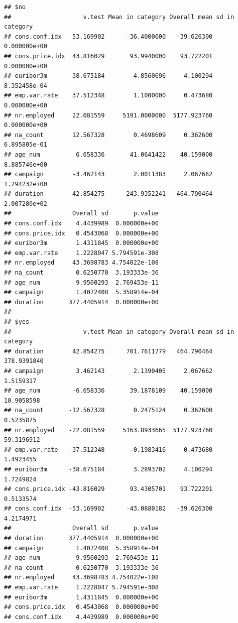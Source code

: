 \documentclass[
]{article}
\newenvironment{Shaded}{\begin{snugshade}}{\end{snugshade}}
\newcommand{\CommentTok}[1]{\textcolor[rgb]{0.56,0.35,0.01}{\textit{#1}}}
\newcommand{\NormalTok}[1]{#1}
\newcommand{\SpecialCharTok}[1]{\textcolor[rgb]{0.00,0.00,0.00}{#1}}
\begin{document}
\begin{verbatim}
## $no
##                    v.test Mean in category Overall mean sd in category
## cons.conf.idx   53.169902      -36.4000000   -39.626300   0.000000e+00
## cons.price.idx  43.816029       93.9940000    93.722201   0.000000e+00
## euribor3m       38.675184        4.8560696     4.100294   8.352458e-04
## emp.var.rate    37.512348        1.1000000     0.473680   0.000000e+00
## nr.employed     22.081559     5191.0000000  5177.923760   0.000000e+00
## na_count        12.567328        0.4698609     0.362600   6.895805e-01
## age_num          6.658336       41.0641422    40.159000   8.885746e+00
## campaign        -3.462143        2.0011383     2.067662   1.294232e+00
## duration       -42.854275      243.9352241   464.790464   2.007280e+02
##                 Overall sd       p.value
## cons.conf.idx    4.4439989  0.000000e+00
## cons.price.idx   0.4543068  0.000000e+00
## euribor3m        1.4311845  0.000000e+00
## emp.var.rate     1.2228047 5.794591e-308
## nr.employed     43.3698783 4.754022e-108
## na_count         0.6250770  3.193333e-36
## age_num          9.9560293  2.769453e-11
## campaign         1.4072408  5.358914e-04
## duration       377.4405914  0.000000e+00
## 
## $yes
##                    v.test Mean in category Overall mean sd in category
## duration        42.854275      701.7611779   464.790464    378.9391840
## campaign         3.462143        2.1390405     2.067662      1.5159317
## age_num         -6.658336       39.1878109    40.159000     10.9058598
## na_count       -12.567328        0.2475124     0.362600      0.5235875
## nr.employed    -22.081559     5163.8933665  5177.923760     59.3196912
## emp.var.rate   -37.512348       -0.1983416     0.473680      1.4923455
## euribor3m      -38.675184        3.2893702     4.100294      1.7249824
## cons.price.idx -43.816029       93.4305701    93.722201      0.5133574
## cons.conf.idx  -53.169902      -43.0880182   -39.626300      4.2174971
##                 Overall sd       p.value
## duration       377.4405914  0.000000e+00
## campaign         1.4072408  5.358914e-04
## age_num          9.9560293  2.769453e-11
## na_count         0.6250770  3.193333e-36
## nr.employed     43.3698783 4.754022e-108
## emp.var.rate     1.2228047 5.794591e-308
## euribor3m        1.4311845  0.000000e+00
## cons.price.idx   0.4543068  0.000000e+00
## cons.conf.idx    4.4439989  0.000000e+00
\end{verbatim}

\begin{Shaded}
\end{Shaded}
\end{document}
